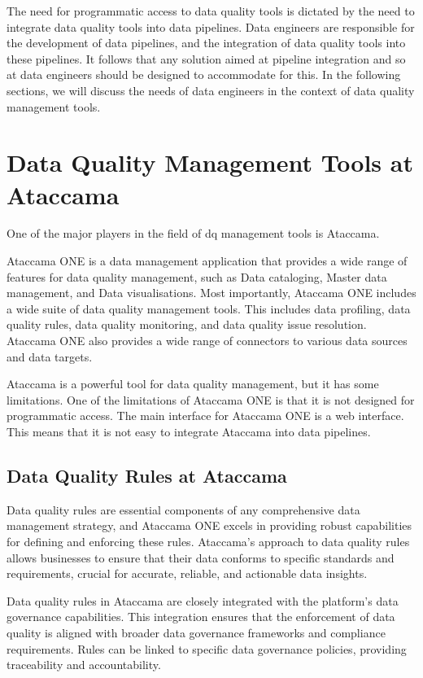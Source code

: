 The need for programmatic access to data quality tools is dictated by the need to integrate data quality tools into data pipelines. Data engineers are responsible for the development of data pipelines, and the integration of data quality tools into these pipelines. It follows that any solution aimed at pipeline integration and so at data engineers should be designed to accommodate for this. In the following sections, we will discuss the needs of data engineers in the context of data quality management tools.

\section{Data Quality Management Tools at Ataccama}

One of the major players in the field of dq management tools is Ataccama. 

Ataccama ONE is a data management application that provides a wide range of features for data quality management, such as Data cataloging, Master data management, and Data visualisations. Most importantly, Ataccama ONE includes a wide suite of data quality management tools. This includes data profiling, data quality rules, data quality monitoring, and data quality issue resolution. Ataccama ONE also provides a wide range of connectors to various data sources and data targets.

Ataccama is a powerful tool for data quality management, but it has some limitations. One of the limitations of Ataccama ONE is that it is not designed for programmatic access. The main interface for Ataccama ONE is a web interface. This means that it is not easy to integrate Ataccama into data pipelines.

\subsection{Data Quality Rules at Ataccama}

Data quality rules are essential components of any comprehensive data management strategy, and Ataccama ONE excels in providing robust capabilities for defining and enforcing these rules. Ataccama's approach to data quality rules allows businesses to ensure that their data conforms to specific standards and requirements, crucial for accurate, reliable, and actionable data insights.

Data quality rules in Ataccama are closely integrated with the platform's data governance capabilities. This integration ensures that the enforcement of data quality is aligned with broader data governance frameworks and compliance requirements. Rules can be linked to specific data governance policies, providing traceability and accountability.

